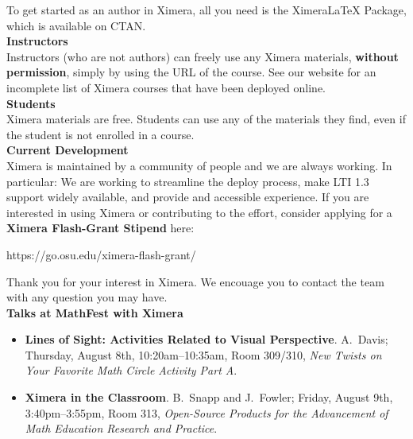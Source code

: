 \documentclass{article}
\begin{document}
\begin{multicols}{2}
\begin{center}
    \end{center}
    To get started as an author in Ximera, all you need is the XimeraLaTeX
    Package, which is available on CTAN.
    \\[.5cm]
    {\sffamily\bfseries Instructors}\\
    Instructors (who are not authors) can freely use any Ximera materials,
    \textbf{without permission}, simply by using the URL of the
    course. See our website for an incomplete list of Ximera
    courses that have been
    deployed online.
    \\[.5cm]
    {\sffamily\bfseries Students}\\
    Ximera materials are free. Students can use any of the materials they
    find, even if the student is not enrolled in a course.
    \\[.5cm]
    {\sffamily\bfseries Current Development}\\
    Ximera is maintained by a community of people and we are always working. In
    particular: We are working to streamline the deploy process,
    make LTI 1.3 support widely available, and provide and accessible experience.
    If you are interested in using Ximera or contributing to the effort, consider
    applying for a \textbf{Ximera Flash-Grant Stipend} here:
    \begin{center}
        https://go.osu.edu/ximera-flash-grant/
    \end{center}
    Thank you for your interest in Ximera. We encouage you
    to contact the team with  any question you may have.
    \\[.5cm]
    {\sffamily\bfseries Talks at MathFest with Ximera}\\
    \begin{itemize}
        \item[{[1]}] \textbf{Lines of Sight: Activities Related to Visual
            Perspective}. A.\ Davis; Thursday, August 8th, 10:20am--10:35am, Room 309/310,
        \textit{New Twists on Your Favorite Math Circle Activity Part A}.
        \item[{[2]}] \textbf{Ximera in the Classroom}. B.\ Snapp and J.\ Fowler;
        Friday, August 9th, 3:40pm--3:55pm, Room 313, \textit{Open-Source Products for
            the Advancement of Math Education Research and Practice}.
    \end{itemize}

\end{multicols}
\end{document}
